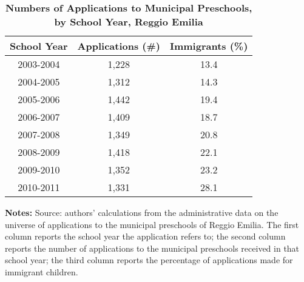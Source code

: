 \documentclass{article}
\begin{document}
\begin{table}[ht!]
\caption{\textbf{Numbers of Applications to Municipal Preschools, by School Year, Reggio Emilia}}
\label{tab:NumApps}
\vspace{-5mm}
\begin{center}
\begin{tabular}{ccc}
\hline\hline
\textbf{School Year} & \textbf{Applications (\#)} & \textbf{Immigrants (\%)} \\
\hline
2003-2004 & 1,228 & 13.4 \\[0.2em]
2004-2005 & 1,312 & 14.3 \\[0.2em]
2005-2006 & 1,442 & 19.4 \\[0.2em]
2006-2007 & 1,409 & 18.7 \\[0.2em]
2007-2008 & 1,349 & 20.8 \\[0.2em]
2008-2009 & 1,418 & 22.1 \\[0.2em]
2009-2010 & 1,352 & 23.2 \\[0.2em]
2010-2011 & 1,331 & 28.1 \\[0.2em]
\hline
\end{tabular}
\end{center}
\footnotesize{{\bfseries Notes:} Source: authors' calculations from the administrative data on the universe of applications to the municipal preschools of Reggio Emilia. The first column reports the school year the application refers to; the second column reports the number of applications to the municipal preschools received in that school year; the third column reports the percentage of applications made for immigrant children.}
\end{table} 
\end{document}
